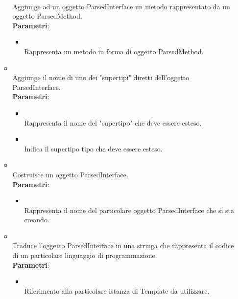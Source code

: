 \begin{itemize}
\begin{itemize}
\\ Aggiunge ad un oggetto ParsedInterface un metodo rappresentato da un oggetto ParsedMethod.
\\ \textbf{Parametri}:
\begin{itemize}
\item {}
\\ Rappresenta un metodo in forma di oggetto ParsedMethod.
\end{itemize}
\item {}
\\ Aggiunge il nome di uno dei "supertipi" diretti dell'oggetto ParsedInterface.
\\ \textbf{Parametri}:
\begin{itemize}
\item {}
\\ Rappresenta il nome del "supertipo" che deve essere esteso.
\item {}
\\ Indica il supertipo tipo che deve essere esteso.
\end{itemize}
\item {}
\\ Costruisce un oggetto ParsedInterface.
\\ \textbf{Parametri}:
\begin{itemize}
\item {}
\\ Rappresenta il nome del particolare oggetto ParsedInterface che si sta creando.
\end{itemize}
\item {}
\\ Traduce l'oggetto ParsedInterface in una stringa che rappresenta il codice di un particolare linguaggio di programmazione.
\\ \textbf{Parametri}:
\begin{itemize}
\item {}
\\ Riferimento alla particolare istanza di Template da utilizzare.
\end{itemize}
\end{itemize}
\end{itemize}

